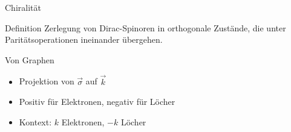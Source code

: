 \documentclass[../defence.tex]{subfiles}
\begin{document}
  \begin{frame}{Chiralität}
    \pause
    \begin{block}{Definition}
      Zerlegung von Dirac-Spinoren in orthogonale Zustände, die unter Paritätsoperationen ineinander übergehen.
    \end{block}
    \pause
    \begin{block}{Von Graphen}
      \pause
      \begin{itemize}
        \item Projektion von $\vec\sigma$ auf $\vec k$
        \pause
        \item Positiv für Elektronen, negativ für Löcher
        \pause
        \item Kontext: $k$ Elektronen, $-k$ Löcher
      \end{itemize}
    \end{block}
  \end{frame}
\end{document}
